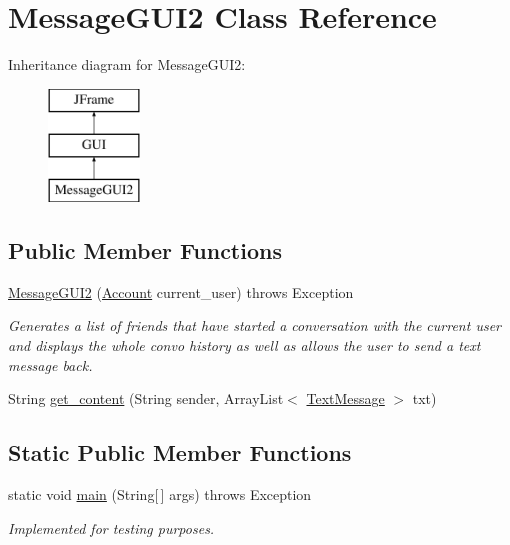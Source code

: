 \hypertarget{class_message_g_u_i2}{}\section{Message\+G\+U\+I2 Class Reference}
\label{class_message_g_u_i2}
Inheritance diagram for Message\+G\+U\+I2\+:\begin{figure}[H]
\begin{center}
\leavevmode
\includegraphics[height=3.000000cm]{class_message_g_u_i2}
\end{center}
\end{figure}
\subsection*{Public Member Functions}
\begin{DoxyCompactItemize}
\item 
\hyperlink{class_message_g_u_i2_a6cb5dea82c3d14b3bc925ee904219840}{Message\+G\+U\+I2} (\hyperlink{class_account}{Account} current\+\_\+user)  throws Exception
\begin{DoxyCompactList}\small\item\em Generates a list of friends that have started a conversation with the current user and displays the whole convo history as well as allows the user to send a text message back. \end{DoxyCompactList}\item 
String \hyperlink{class_message_g_u_i2_a3dfc57369fa2003712cebd9c2cf40fd1}{get\+\_\+content} (String sender, Array\+List$<$ \hyperlink{class_text_message}{Text\+Message} $>$ txt)
\end{DoxyCompactItemize}
\subsection*{Static Public Member Functions}
\begin{DoxyCompactItemize}
\item 
\mbox{\label{class_message_g_u_i2_ad8fa5c5e6f8daa39a97eb69e7a575f97}} 
static void \hyperlink{class_message_g_u_i2_ad8fa5c5e6f8daa39a97eb69e7a575f97}{main} (String\mbox{[}$\,$\mbox{]} args)  throws Exception
\begin{DoxyCompactList}\small\item\em Implemented for testing purposes. \end{DoxyCompactList}\end{DoxyCompactItemize}


